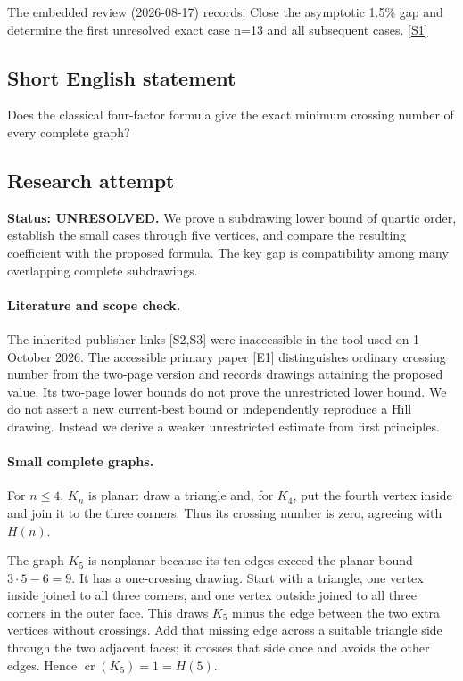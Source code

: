 \documentclass[11pt,a4paper]{article}
\newcommand{\sref}[2]{\hyperlink{source:#1:#2}{[S#2]}}
\begin{document}
The embedded review (2026-08-17) records: Close the asymptotic 1.5\% gap and determine the first unresolved exact case n=13 and all subsequent cases. \sref{statement}{1}

\subsection{Short English statement}

Does the classical four-factor formula give the exact minimum crossing number of every complete graph?

\subsection{Research attempt}
\textbf{Status: UNRESOLVED.} We prove a subdrawing lower bound of quartic order, establish the small cases through five vertices, and compare the resulting coefficient with the proposed formula. The key gap is compatibility among many overlapping complete subdrawings.

\paragraph{Literature and scope check.}
The inherited publisher links [S2,S3] were inaccessible in the tool used on 1 October 2026. The accessible primary paper [E1] distinguishes ordinary crossing number from the two-page version and records drawings attaining the proposed value. Its two-page lower bounds do not prove the unrestricted lower bound. We do not assert a new current-best bound or independently reproduce a Hill drawing. Instead we derive a weaker unrestricted estimate from first principles.

\paragraph{Small complete graphs.}
For $n\le4$, $K_n$ is planar: draw a triangle and, for $K_4$, put the fourth vertex inside and join it to the three corners. Thus its crossing number is zero, agreeing with $H(n)$.

The graph $K_5$ is nonplanar because its ten edges exceed the planar bound $3\cdot5-6=9$. It has a one-crossing drawing. Start with a triangle, one vertex inside joined to all three corners, and one vertex outside joined to all three corners in the outer face. This draws $K_5$ minus the edge between the two extra vertices without crossings. Add that missing edge across a suitable triangle side through the two adjacent faces; it crosses that side once and avoids the other edges. Hence $\operatorname{cr}(K_5)=1=H(5)$.
\end{document}
